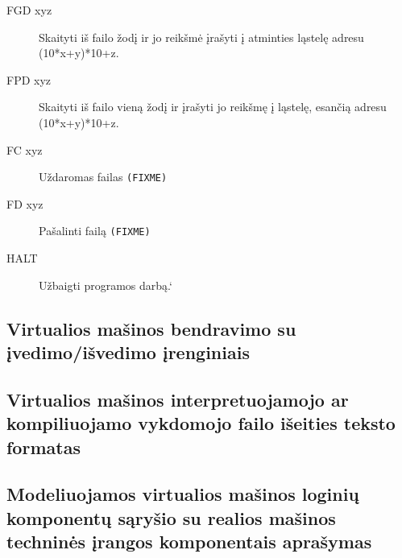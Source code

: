 \begin{description}
\begin{description}
        \item[FGD xyz] Skaityti iš failo žodį ir jo reikšmė įrašyti į
          atminties ląstelę adresu (10*x+y)*10+z.
        \item[FPD xyz] Skaityti iš failo vieną žodį ir įrašyti jo 
          reikšmę į ląstelę, esančią adresu (10*x+y)*10+z.
        \item[FC xyz] Uždaromas failas \verb|(FIXME)|%
        \item[FD xyz] Pašalinti failą \verb|(FIXME)|%
        \item[HALT] Užbaigti programos darbą.`
    \end{description}
  \end{description} 
\subsection{Virtualios mašinos bendravimo su įvedimo/išvedimo įrenginiais}

\subsection{Virtualios mašinos interpretuojamojo ar kompiliuojamo vykdomojo 
failo išeities teksto formatas}

\subsection{Modeliuojamos virtualios mašinos loginių komponentų sąryšio su 
realios mašinos techninės įrangos komponentais aprašymas}
   




